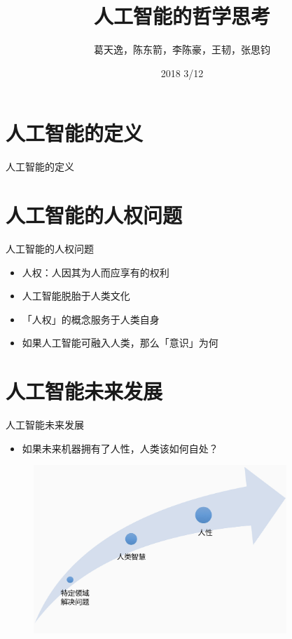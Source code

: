 \documentclass{beamer}
\title{人工智能的哲学思考}
\date{2018 3/12}
\author{葛天逸，陈东箭，李陈豪，王韧，张思钧}
\institute{马克思主义基本原理概论课堂讨论}
\begin{document}
  \maketitle
  \tableofcontents

  \section{人工智能的定义}
  \begin{frame}{人工智能的定义}
  \end{frame}



  \section{人工智能的人权问题}
  \begin{frame}{人工智能的人权问题}
    \begin{itemize}
     \item 人权：人因其为人而应享有的权利
     \item 人工智能脱胎于人类文化
     \item 「人权」的概念服务于人类自身  
     \item 如果人工智能可融入人类，那么「意识」为何
    \end{itemize}
  \end{frame}

  \section{人工智能未来发展}

  \begin{frame}{人工智能未来发展}
    \begin{itemize}
     \item  如果未来机器拥有了人性，人类该如何自处？
    \end{itemize}
   \begin{figure}[H]
   \centering
   \includegraphics[height=2.5in]{cdjPic1.jpg}
   \end{figure}
  \end{frame}
  
\end{document}
